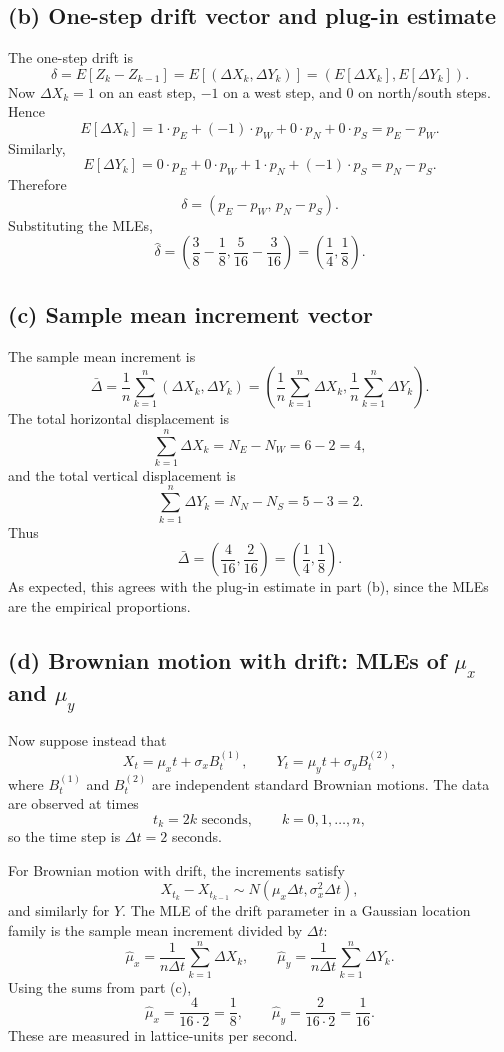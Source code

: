 \documentclass[11pt]{article}
\begin{document}
\subsection*{(b) One-step drift vector and plug-in estimate}
The one-step drift is
\[
\delta=E[Z_k-Z_{k-1}]=E[(\Delta X_k,\Delta Y_k)]=(E[\Delta X_k],E[\Delta Y_k]).
\]
Now $\Delta X_k=1$ on an east step, $-1$ on a west step, and $0$ on north/south steps. Hence
\[
E[\Delta X_k]=1\cdot p_E+(-1)\cdot p_W+0\cdot p_N+0\cdot p_S=p_E-p_W.
\]
Similarly,
\[
E[\Delta Y_k]=0\cdot p_E+0\cdot p_W+1\cdot p_N+(-1)\cdot p_S=p_N-p_S.
\]
Therefore
\[
\delta=(p_E-p_W,\,p_N-p_S).
\]
Substituting the MLEs,
\[
\hat\delta=\left(\frac38-\frac18,\frac{5}{16}-\frac{3}{16}\right)=\left(\frac14,\frac18\right).
\]

\subsection*{(c) Sample mean increment vector}
The sample mean increment is
\[
\bar\Delta=\frac1n\sum_{k=1}^n(\Delta X_k,\Delta Y_k)=\left(\frac1n\sum_{k=1}^n\Delta X_k,\frac1n\sum_{k=1}^n\Delta Y_k\right).
\]
The total horizontal displacement is
\[
\sum_{k=1}^n \Delta X_k=N_E-N_W=6-2=4,
\]
and the total vertical displacement is
\[
\sum_{k=1}^n \Delta Y_k=N_N-N_S=5-3=2.
\]
Thus
\[
\bar\Delta=\left(\frac{4}{16},\frac{2}{16}\right)=\left(\frac14,\frac18\right).
\]
As expected, this agrees with the plug-in estimate in part (b), since the MLEs are the empirical proportions.

\subsection*{(d) Brownian motion with drift: MLEs of $\mu_x$ and $\mu_y$}
Now suppose instead that
\[
X_t=\mu_x t+\sigma_x B_t^{(1)},
\qquad
Y_t=\mu_y t+\sigma_y B_t^{(2)},
\]
where $B_t^{(1)}$ and $B_t^{(2)}$ are independent standard Brownian motions. The data are observed at times
\[
t_k=2k\text{ seconds},\qquad k=0,1,\dots,n,
\]
so the time step is $\Delta t=2$ seconds.

For Brownian motion with drift, the increments satisfy
\[
X_{t_k}-X_{t_{k-1}}\sim N(\mu_x\Delta t,\sigma_x^2\Delta t),
\]
and similarly for $Y$. The MLE of the drift parameter in a Gaussian location family is the sample mean increment divided by $\Delta t$:
\[
\hat\mu_x=\frac{1}{n\Delta t}\sum_{k=1}^n \Delta X_k,
\qquad
\hat\mu_y=\frac{1}{n\Delta t}\sum_{k=1}^n \Delta Y_k.
\]
Using the sums from part (c),
\[
\hat\mu_x=\frac{4}{16\cdot 2}=\frac18,
\qquad
\hat\mu_y=\frac{2}{16\cdot 2}=\frac1{16}.
\]
These are measured in lattice-units per second.
\end{document}
